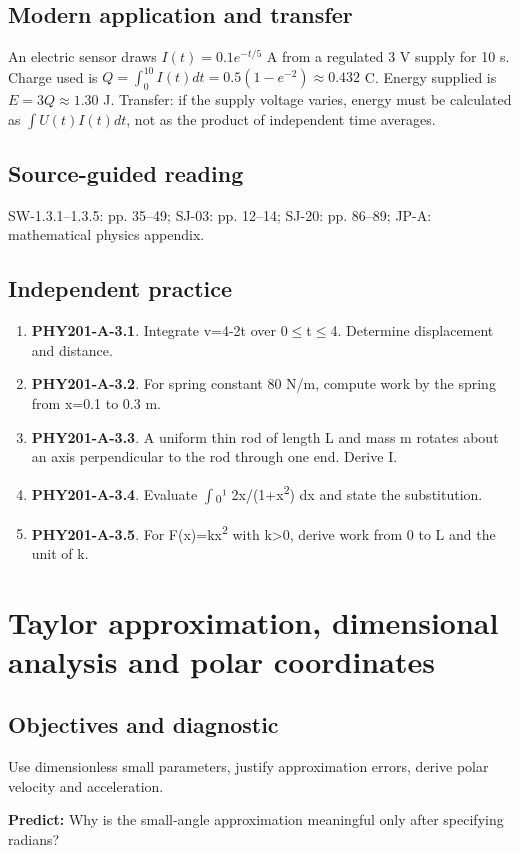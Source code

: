 \documentclass[11pt,a4paper,openany]{book}
\begin{document}
\section{Modern application and transfer}
An electric sensor draws $I(t)=0.1e^{-t/5}$ A from a regulated 3 V supply for 10 s. Charge used is $Q=\int_0^{10}I(t)dt=0.5(1-e^{-2})\approx0.432$ C. Energy supplied is $E=3Q\approx1.30$ J. Transfer: if the supply voltage varies, energy must be calculated as $\int U(t)I(t)dt$, not as the product of independent time averages.
\section{Source-guided reading}
SW-1.3.1–1.3.5: pp. 35–49; SJ-03: pp. 12–14; SJ-20: pp. 86–89; JP-A: mathematical physics appendix.
\section{Independent practice}
\begin{enumerate}
\item \textbf{PHY201-A-3.1}. Integrate v=4-2t over 0\ensuremath{\le}t\ensuremath{\le}4. Determine displacement and distance.
\item \textbf{PHY201-A-3.2}. For spring constant 80 N/m, compute work by the spring from x=0.1 to 0.3 m.
\item \textbf{PHY201-A-3.3}. A uniform thin rod of length L and mass m rotates about an axis perpendicular to the rod through one end. Derive I.
\item \textbf{PHY201-A-3.4}. Evaluate \ensuremath{\int}\textsubscript{0}¹ 2x/(1+x\textsuperscript{2}) dx and state the substitution.
\item \textbf{PHY201-A-3.5}. For F(x)=kx\textsuperscript{2} with k>0, derive work from 0 to L and the unit of k.
\end{enumerate}
\chapter{Taylor approximation, dimensional analysis and polar coordinates}
\section{Objectives and diagnostic}
Use dimensionless small parameters, justify approximation errors, derive polar velocity and acceleration.

\textbf{Predict:} Why is the small-angle approximation meaningful only after specifying radians?
\end{document}
